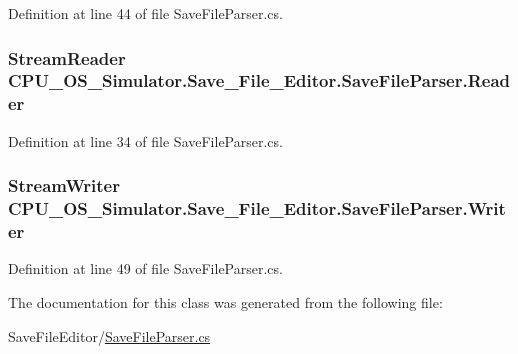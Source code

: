 Definition at line 44 of file Save\+File\+Parser.\+cs.

\hypertarget{class_c_p_u___o_s___simulator_1_1_save___file___editor_1_1_save_file_parser_a25426185d4fb772b2525955e3003b25a}{}
\subsubsection[{Reader}]{\setlength{\rightskip}{0pt plus 5cm}Stream\+Reader C\+P\+U\+\_\+\+O\+S\+\_\+\+Simulator.\+Save\+\_\+\+File\+\_\+\+Editor.\+Save\+File\+Parser.\+Reader\hspace{0.3cm}{\ttfamily [get]}}\label{class_c_p_u___o_s___simulator_1_1_save___file___editor_1_1_save_file_parser_a25426185d4fb772b2525955e3003b25a}


Definition at line 34 of file Save\+File\+Parser.\+cs.

\hypertarget{class_c_p_u___o_s___simulator_1_1_save___file___editor_1_1_save_file_parser_aa0ae615cf418a985ccdc251f75e9f354}{}
\subsubsection[{Writer}]{\setlength{\rightskip}{0pt plus 5cm}Stream\+Writer C\+P\+U\+\_\+\+O\+S\+\_\+\+Simulator.\+Save\+\_\+\+File\+\_\+\+Editor.\+Save\+File\+Parser.\+Writer\hspace{0.3cm}{\ttfamily [get]}}\label{class_c_p_u___o_s___simulator_1_1_save___file___editor_1_1_save_file_parser_aa0ae615cf418a985ccdc251f75e9f354}


Definition at line 49 of file Save\+File\+Parser.\+cs.



The documentation for this class was generated from the following file\+:\begin{DoxyCompactItemize}
\item 
Save\+File\+Editor/\hyperlink{_save_file_parser_8cs}{Save\+File\+Parser.\+cs}\end{DoxyCompactItemize}
